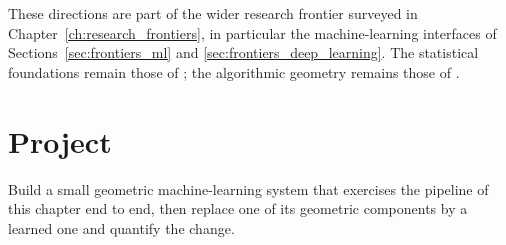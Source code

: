 These directions are part of the wider research frontier surveyed in
Chapter~\ref{ch:research_frontiers}, in particular the machine-learning
interfaces of Sections~\ref{sec:frontiers_ml} and
\ref{sec:frontiers_deep_learning}. The statistical foundations remain those
of \cite{bishop2006,hastie2009,duda2001}; the algorithmic geometry remains
those of \cite{deberg2008,harpeled2011}.


\section{Project}
\label{sec:data_ml_project}

Build a small geometric machine-learning system that exercises the pipeline
of this chapter end to end, then replace one of its geometric components by
a learned one and quantify the change.
